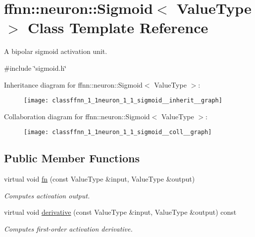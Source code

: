 \hypertarget{classffnn_1_1neuron_1_1_sigmoid}{\section{ffnn\-:\-:neuron\-:\-:Sigmoid$<$ Value\-Type $>$ Class Template Reference}
\label{classffnn_1_1neuron_1_1_sigmoid}
}


A bipolar sigmoid activation unit.  




{\ttfamily \#include \char`\"{}sigmoid.\-h\char`\"{}}



Inheritance diagram for ffnn\-:\-:neuron\-:\-:Sigmoid$<$ Value\-Type $>$\-:\nopagebreak
\begin{figure}[H]
\begin{center}
\leavevmode
\texttt{[image: classffnn\_1\_1neuron\_1\_1\_sigmoid\_\_inherit\_\_graph]}
\end{center}
\end{figure}


Collaboration diagram for ffnn\-:\-:neuron\-:\-:Sigmoid$<$ Value\-Type $>$\-:\nopagebreak
\begin{figure}[H]
\begin{center}
\leavevmode
\texttt{[image: classffnn\_1\_1neuron\_1\_1\_sigmoid\_\_coll\_\_graph]}
\end{center}
\end{figure}
\subsection*{Public Member Functions}
\begin{DoxyCompactItemize}
\item 
virtual void \hyperlink{classffnn_1_1neuron_1_1_sigmoid_a68c1cf4f268509e87a471440d11e7682}{fn} (const Value\-Type \&input, Value\-Type \&output)
\begin{DoxyCompactList}\small\item\em Computes activation output. \end{DoxyCompactList}\item 
virtual void \hyperlink{classffnn_1_1neuron_1_1_sigmoid_aee2a196924df30414539d75caa6c7030}{derivative} (const Value\-Type \&input, Value\-Type \&output) const 
\begin{DoxyCompactList}\small\item\em Computes first-\/order activation derivative. \end{DoxyCompactList}\end{DoxyCompactItemize}



